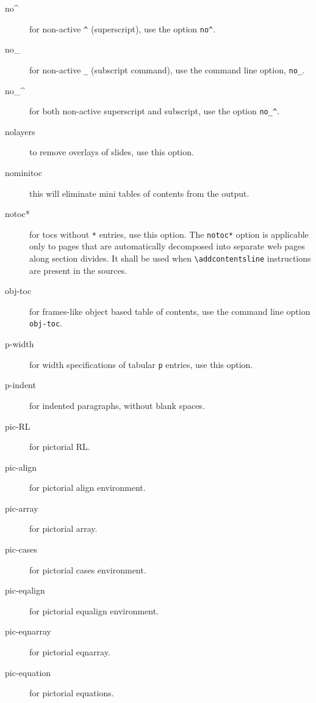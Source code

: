\begin{description}
\item[no\textasciicircum] for non-active \verb=^= (superscript), use the option
  \verb=no^=.

\item[no\_] for non-active \verb=_= (subscript command), use the
  command line option, \verb=no_=.

\item[no\_\textasciicircum] for both non-active superscript and subscript, use the
  option \verb=no_^=.

\item[nolayers] to remove overlays of slides, use this option.

\item[nominitoc] this will eliminate mini tables of contents from the
  output.

\item[notoc*] for tocs without \verb=*= entries, use this option. The
  \verb=notoc*= option is applicable only to pages that are
  automatically decomposed into separate web pages along section
  divides. It shall be used when \verb=\addcontentsline= instructions
  are present in the sources.

\item[obj-toc] for frames-like object based table of contents, use the
  command line option \verb=obj-toc=.


\item[p-width] for width specifications of tabular \verb=p= entries,
  use this option.

\item[p-indent] for indented paragraphs, without blank spaces.

\item[pic-RL] for pictorial RL.

\item[pic-align] for pictorial align environment.

\item[pic-array] for pictorial array.

\item[pic-cases] for pictorial cases environment.

\item[pic-eqalign] for pictorial equalign environment.

\item[pic-eqnarray] for pictorial eqnarray.

\item[pic-equation] for pictorial equations.


\end{description}

